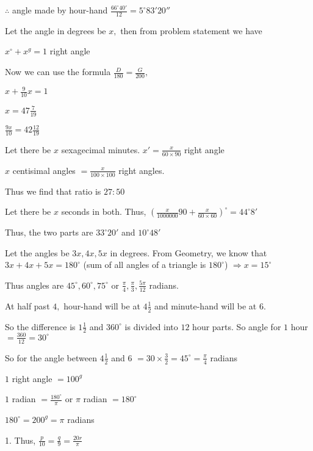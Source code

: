     $\therefore$ angle made by hour-hand $\frac{66^\circ40'}{12} = 5^\circ83'20''$

\item Let the angle in degrees be $x,$ then from problem statement we have

    $x^\circ + x^g = 1$ right angle

    Now we can use the formula $\frac{D}{180} = \frac{G}{200},$

    $x + \frac{9}{10}x = 1$

    $x = 47\frac{7}{19}$

    $\frac{9x}{10} = 42\frac{12}{19}$

\item Let there be $x$ sexagecimal minutes. $x' = \frac{x}{60\times 90}$ right angle

    $x$ centisimal angles $= \frac{x}{100\times100}$ right angles.

    Thus we find that ratio is $27:50$

\item Let there be $x$ seconds in both. Thus, $\left(\frac{x}{1000000}90 + \frac{x}{60\times60}\right)^\circ =
    44^\circ8'$

    Thus, the two parts are $33^\circ20'$ and $10^\circ48'$

\item Let the angles be $3x, 4x, 5x$ in degrees. From Geometry, we know that $3x + 4x + 5x = 180^\circ$ (sum of all
    angles of a triangle is $180^\circ$) $\Rightarrow x = 15^\circ$

    Thus angles are $45^\circ, 60^\circ, 75^\circ$ or $\frac{\pi}{4}, \frac{\pi}{3}, \frac{5\pi}{12}$ radians.

\item At half past $4,$ hour-hand will be at $4\frac{1}{2}$ and minute-hand will be at $6.$

    So the difference is $1\frac{1}{2}$ and $360^\circ$ is divided into $12$ hour parts. So angle for $1$
    hour $= \frac{360}{12} = 30^\circ$

    So for the angle between $4\frac{1}{2}$ and $6$ $= 30\times \frac{3}{2} = 45^\circ = \frac{\pi}{4}$ radians

\item $1$ right angle $= 100^g$

    $1$ radian $= \frac{180^\circ}{\pi}$ or $\pi$ radian $= 180^\circ$

    $180^\circ = 200^g = \pi$ radians

    1. Thus, $\frac{p}{10} = \frac{q}{9} = \frac{20r}{\pi}$

